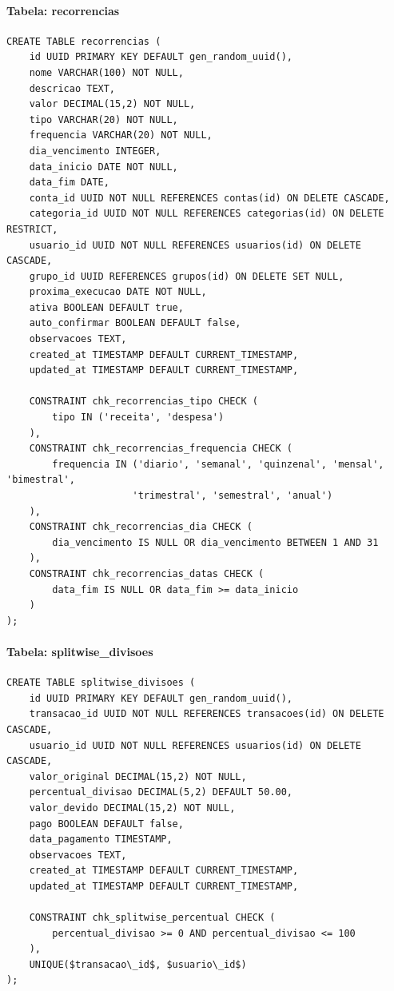 \paragraph{Tabela: recorrencias}
\begin{lstlisting}[caption=Estrutura da tabela recorrencias]
CREATE TABLE recorrencias (
    id UUID PRIMARY KEY DEFAULT gen_random_uuid(),
    nome VARCHAR(100) NOT NULL,
    descricao TEXT,
    valor DECIMAL(15,2) NOT NULL,
    tipo VARCHAR(20) NOT NULL,
    frequencia VARCHAR(20) NOT NULL,
    dia_vencimento INTEGER,
    data_inicio DATE NOT NULL,
    data_fim DATE,
    conta_id UUID NOT NULL REFERENCES contas(id) ON DELETE CASCADE,
    categoria_id UUID NOT NULL REFERENCES categorias(id) ON DELETE RESTRICT,
    usuario_id UUID NOT NULL REFERENCES usuarios(id) ON DELETE CASCADE,
    grupo_id UUID REFERENCES grupos(id) ON DELETE SET NULL,
    proxima_execucao DATE NOT NULL,
    ativa BOOLEAN DEFAULT true,
    auto_confirmar BOOLEAN DEFAULT false,
    observacoes TEXT,
    created_at TIMESTAMP DEFAULT CURRENT_TIMESTAMP,
    updated_at TIMESTAMP DEFAULT CURRENT_TIMESTAMP,
    
    CONSTRAINT chk_recorrencias_tipo CHECK (
        tipo IN ('receita', 'despesa')
    ),
    CONSTRAINT chk_recorrencias_frequencia CHECK (
        frequencia IN ('diario', 'semanal', 'quinzenal', 'mensal', 'bimestral', 
                      'trimestral', 'semestral', 'anual')
    ),
    CONSTRAINT chk_recorrencias_dia CHECK (
        dia_vencimento IS NULL OR dia_vencimento BETWEEN 1 AND 31
    ),
    CONSTRAINT chk_recorrencias_datas CHECK (
        data_fim IS NULL OR data_fim >= data_inicio
    )
);
\end{lstlisting}

\paragraph{Tabela: splitwise\_divisoes}
\begin{lstlisting}[caption=Estrutura da tabela splitwise_divisoes]
CREATE TABLE splitwise_divisoes (
    id UUID PRIMARY KEY DEFAULT gen_random_uuid(),
    transacao_id UUID NOT NULL REFERENCES transacoes(id) ON DELETE CASCADE,
    usuario_id UUID NOT NULL REFERENCES usuarios(id) ON DELETE CASCADE,
    valor_original DECIMAL(15,2) NOT NULL,
    percentual_divisao DECIMAL(5,2) DEFAULT 50.00,
    valor_devido DECIMAL(15,2) NOT NULL,
    pago BOOLEAN DEFAULT false,
    data_pagamento TIMESTAMP,
    observacoes TEXT,
    created_at TIMESTAMP DEFAULT CURRENT_TIMESTAMP,
    updated_at TIMESTAMP DEFAULT CURRENT_TIMESTAMP,
    
    CONSTRAINT chk_splitwise_percentual CHECK (
        percentual_divisao >= 0 AND percentual_divisao <= 100
    ),
    UNIQUE($transacao\_id$, $usuario\_id$)
);
\end{lstlisting}

